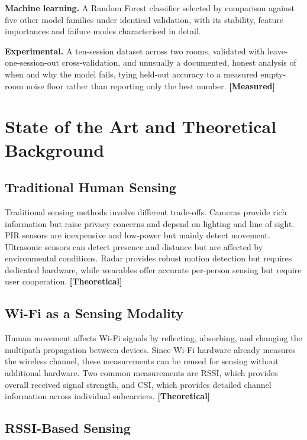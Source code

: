 \documentclass[11pt,a4paper,oneside]{report}
\newcommand{\evidencetag}[2]{{\small\sffamily\bfseries\textcolor{#1}{[#2]}}}
\newcommand{\Meas}{\evidencetag{accent}{Measured}}
\newcommand{\Theo}{\evidencetag{warn}{Theoretical}}
\begin{document}
\textbf{Machine learning.} A Random Forest classifier selected by comparison
against five other model families under identical validation, with its
stability, feature importances and failure modes characterised in detail. 

\textbf{Experimental.} A ten-session dataset across two rooms, validated with
leave-one-session-out cross-validation, and  unusually  a documented,
honest analysis of when and why the model fails, tying held-out accuracy to a
measured empty-room noise floor rather than reporting only the best number.
\Meas

\chapter{State of the Art and Theoretical Background}
\label{ch:sota}

\section{Traditional Human Sensing}

Traditional sensing methods involve different trade-offs. Cameras provide rich information but raise privacy concerns and depend on lighting and line of sight. PIR sensors are inexpensive and low-power but mainly detect movement. Ultrasonic sensors can detect presence and distance but are affected by environmental conditions. Radar provides robust motion detection but requires dedicated hardware, while wearables offer accurate per-person sensing but require user cooperation. \Theo

\section{Wi-Fi as a Sensing Modality}

Human movement affects Wi-Fi signals by reflecting, absorbing, and changing the multipath propagation between devices. Since Wi-Fi hardware already measures the wireless channel, these measurements can be reused for sensing without additional hardware. Two common measurements are RSSI, which provides overall received signal strength, and CSI, which provides detailed channel information across individual subcarriers. \Theo

\section{RSSI-Based Sensing}
\end{document}
